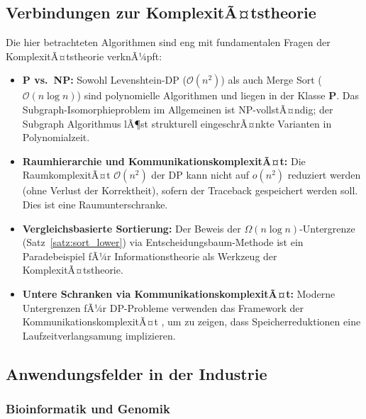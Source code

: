 ﻿\documentclass[a4paper,12pt]{article}
\theoremstyle{definition}
\begin{document}
\subsection{Verbindungen zur KomplexitÃ¤tstheorie}

Die hier betrachteten Algorithmen sind eng mit fundamentalen Fragen der
KomplexitÃ¤tstheorie verknÃ¼pft:

\begin{itemize}
    \item \textbf{P vs.\ NP:} Sowohl Levenshtein-DP ($\mathcal{O}(n^2)$) als auch
          Merge Sort ($\mathcal{O}(n \log n)$) sind polynomielle Algorithmen und
          liegen in der Klasse $\mathbf{P}$. Das Subgraph-Isomorphieproblem im
          Allgemeinen ist NP-vollstÃ¤ndig; der Subgraph Algorithmus \cite{epp2026subgraph}
          lÃ¶st strukturell eingeschrÃ¤nkte Varianten in Polynomialzeit.
    \item \textbf{Raumhierarchie und KommunikationskomplexitÃ¤t:}
          Die RaumkomplexitÃ¤t $\mathcal{O}(n^2)$ der DP kann nicht auf
          $o(n^2)$ reduziert werden (ohne Verlust der Korrektheit), sofern der
          Traceback gespeichert werden soll. Dies ist eine Raumunterschranke.
    \item \textbf{Vergleichsbasierte Sortierung:} Der Beweis der
          $\Omega(n \log n)$-Untergrenze (Satz~\ref{satz:sort_lower}) via
          Entscheidungsbaum-Methode ist ein Paradebeispiel fÃ¼r Informationstheorie
          als Werkzeug der Komple\-xi\-tÃ¤ts\-theorie.
    \item \textbf{Untere Schranken via KommunikationskomplexitÃ¤t:}
          Moderne Untergrenzen fÃ¼r DP-Probleme verwenden das Framework der
          KommunikationskomplexitÃ¤t \cite{kushilevitz1997}, um zu zeigen, dass
          Speicherreduktionen eine Laufzeitverlangsamung implizieren.
\end{itemize}

\subsection{Anwendungsfelder in der Industrie}

\subsubsection{Bioinformatik und Genomik}
\end{document}
